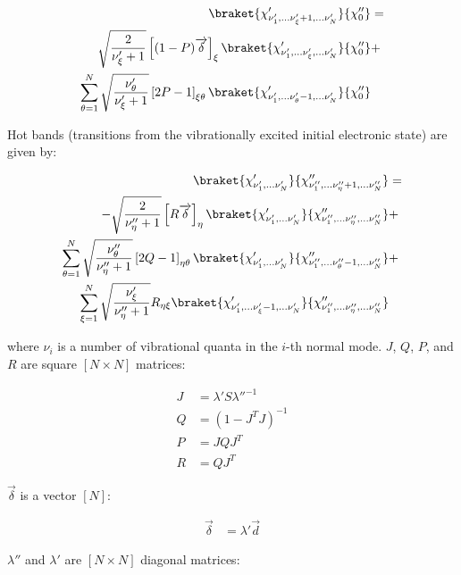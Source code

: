 \documentclass[11pt]{article}
\begin{document}
\begin{align}
\braket{ \chi'_{\nu'_1,...\nu'_{\xi}+1,...\nu'_N} }{\chi''_0}&=\nonumber\\
\sqrt{\frac{2}{\nu'_{\xi}+1}} \left[ (1-P)\overrightarrow{\delta}\right]_{\xi} 
\braket{ \chi'_{\nu'_1,...\nu'_{\xi},...\nu'_N} }{\chi''_0}&+\nonumber\\
\sum_{\theta=1}^{N} \sqrt{\frac{\nu'_{\theta}}{\nu'_{\xi}+1}}  \left[ 2P-1\right]_{\xi\theta}
\braket{ \chi'_{\nu'_1,...\nu'_{\theta}-1,...\nu'_N} }{\chi''_0}&
\end{align}

Hot bands (transitions from the vibrationally excited initial electronic state) are 
given by:

\begin{align}
\braket{ \chi'_{\nu'_1,...\nu'_N} }{ \chi''_{\nu''_1,...\nu''_{\eta}+1,...\nu''_N} }&=\nonumber\\
-\sqrt{\frac{2}{\nu''_{\eta}+1}} \left[ R\overrightarrow{\delta} \right]_{\eta}
\braket{ \chi'_{\nu'_1,...\nu'_N} }{ \chi''_{\nu''_1,...\nu''_{\eta},...\nu''_N} }&+\nonumber\\
\sum_{\theta=1}^{N}   \sqrt{ \frac{\nu''_{\theta}}{\nu''_{\eta}+1} }   \left[ 2Q-1 \right]_{\eta\theta}
\braket{ \chi'_{\nu'_1,...\nu'_N} }{ \chi''_{\nu''_1,...\nu''_{\theta}-1,...\nu''_N} }&+\nonumber\\
\sum_{\xi=1}^{N}   \sqrt{ \frac{\nu'_{\xi}}{\nu''_{\eta}+1} }   R_{\eta\xi}
\braket{ \chi'_{\nu'_1,...\nu'_{\xi}-1,...\nu'_N} }{ \chi''_{\nu''_1,...\nu''_{\eta},...\nu''_N} }&
\end{align}

where $\nu_i$ is a number of vibrational quanta in the $i$-th normal mode.
$J$, $Q$, $P$, and $R$ are square $[N\times N]$ matrices:

\begin{align}
J&=\lambda' S \lambda''^{-1}\nonumber\\
Q&=(1-J^TJ)^{-1}\nonumber\\
P&=JQJ^T\nonumber\\
R&=QJ^T\nonumber
\end{align}

$\overrightarrow{\delta}$ is a vector $[N]$:

\begin{align}
\overrightarrow{\delta}&=\lambda'\overrightarrow{d}\nonumber
\end{align}

$\lambda''$ and $\lambda'$ are $[N\times N]$ diagonal matrices:
\end{document}
